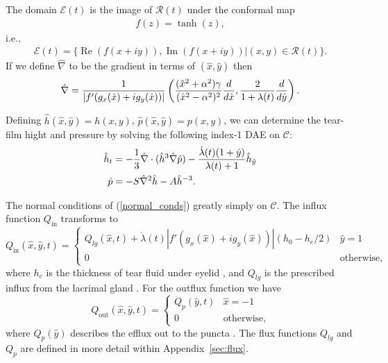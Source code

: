 The domain $\mathcal{E}(t)$ is the image of $\mathcal{R}(t)$ under the conformal map
\begin{align}
f(z) = \tanh(z),
\end{align}
i.e.,
\begin{align}
\mathcal{E}(t) = \{\operatorname{Re}(f(x+iy)),\operatorname{Im}(f(x+iy))|(x,y) \in \mathcal{R}(t)  \}.
\end{align}
If we define $\hat{\nabla}$ to be the gradient in terms of $(\hat{x},\hat{y})$ then
\begin{align}
\hat{\nabla} = \frac{1}{|f'(g_x(\hat{x})+i g_y(\hat{x}))|} \left( \frac{(\hat{x}^2+\alpha^2)\gamma}{(\hat{x}^2-\alpha^2)^2} \frac{d}{d \hat{x}}, \frac{2}{1+\lambda(t)} \frac{d}{d \hat{y}} \right).
\end{align}

Defining $\hat{h}(\hat{x},\hat{y})=h(x,y)$, $\hat{p}(\hat{x},\hat{y})=p(x,y)$, we can determine the tear-film hight and pressure by solving the following index-1 DAE on $\mathcal{C}$:
\begin{align}
\begin{aligned}
\hat{h}_t &= -\frac{1}{3} \hat{\nabla} \cdot (\hat{h}^3 \hat{\nabla} \hat{p}) -\frac{\dot{\lambda}(t)(1+\hat{y})}{\lambda(t)+1} \hat{h}_{\hat{y}} \\
\hat{p} &= - S \hat{\nabla}^2 \hat{h} - A \hat{h}^{-3}.
\end{aligned}
\end{align}

The normal conditions of (\ref{normal_conds}) greatly simply on $\mathcal{C}$. The influx function $Q_{\text{in}}$ transforms to
\begin{equation}
Q_{\text{in}}(\hat{x},\hat{y},t) = \begin{cases}
Q_{lg}(\hat{x},t) + \dot{\lambda}(t)|f'(g_x(\hat{x})+i g_y(\hat{x}))|(h_0-h_e/2) & \hat{y}=1 \\
0 & \text{otherwise},
\end{cases}
\label{influx_fun}
\end{equation}
where $h_e$ is the thickness of tear fluid under eyelid \cite{heryudono2007single}, and $Q_{lg}$ is the prescribed influx from the lacrimal gland \cite{braun2015dynamics}. For the outflux function we have
\begin{equation}
Q_{\text{out}}(\hat{x},\hat{y},t) = \begin{cases}
Q_{p}(\hat{y},t) & \hat{x}=-1 \\
0 & \text{otherwise},
\end{cases}
\label{out_flux_fun}
\end{equation}
where $Q_{p}(\hat{y})$ describes the efflux out to the puncta \cite{braun2015dynamics}. The flux functions $Q_{lg}$ and $Q_p$ are defined in more detail within Appendix~\ref{sec:flux}.

